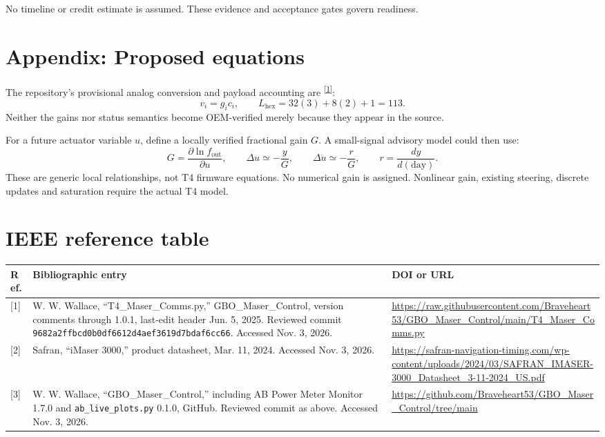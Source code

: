 \documentclass[11pt,a4paper]{article}
\newcommand{\codecite}{\textsuperscript{\href{https://raw.githubusercontent.com/Braveheart53/GBO_Maser_Control/main/T4_Maser_Comms.py}{[1]}}}
\begin{document}
No timeline or credit estimate is assumed. These evidence and acceptance
gates govern readiness.

\section{Appendix: Proposed equations}
The repository's provisional analog conversion and payload accounting are
\codecite:
\[
v_i=g_i c_i,\qquad L_{\mathrm{hex}}=32(3)+8(2)+1=113.
\]
Neither the gains nor status semantics become OEM-verified merely because
they appear in the source.

For a future actuator variable \(u\), define a locally verified fractional
gain \(G\). A small-signal advisory model could then use:
\[
G=\frac{\partial\ln f_{\mathrm{out}}}{\partial u},\qquad
\Delta u\simeq-\frac{y}{G},\qquad
\Delta\dot u\simeq-\frac{r}{G},\qquad
r=\frac{dy}{d(\mathrm{day})}.
\]
These are generic local relationships, not T4 firmware equations. No numerical
gain is assigned. Nonlinear gain, existing steering, discrete updates and
saturation require the actual T4 model.

\section{IEEE reference table}
\small
\begin{longtable}{@{}p{.05\linewidth}p{.51\linewidth}p{.36\linewidth}@{}}
\toprule
Ref. & Bibliographic entry & DOI or URL\\
\midrule
{[1]} & W. W. Wallace, ``T4\_Maser\_Comms.py,'' GBO\_Maser\_Control,
version comments through 1.0.1, last-edit header Jun. 5, 2025. Reviewed commit
\nolinkurl{9682a2ffbcd0b0df6612d4aef3619d7bdaf6cc66}. Accessed Nov. 3, 2026.
& \url{https://raw.githubusercontent.com/Braveheart53/GBO_Maser_Control/main/T4_Maser_Comms.py}\\[4pt]
{[2]} & Safran, ``iMaser 3000,'' product datasheet, Mar. 11, 2024.
Accessed Nov. 3, 2026.
& \url{https://safran-navigation-timing.com/wp-content/uploads/2024/03/SAFRAN_IMASER-3000_Datasheet_3-11-2024_US.pdf}\\[4pt]
{[3]} & W. W. Wallace, ``GBO\_Maser\_Control,'' including AB Power Meter
Monitor 1.7.0 and \texttt{ab\_live\_plots.py} 0.1.0, GitHub.
Reviewed commit as above. Accessed Nov. 3, 2026.
& \url{https://github.com/Braveheart53/GBO_Maser_Control/tree/main}\\
\bottomrule
\end{longtable}
\end{document}
